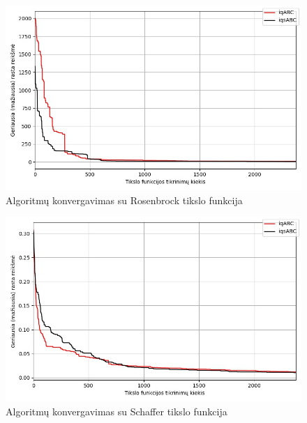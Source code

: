 \documentclass{VUMIFPSmagistrinis}
\begin{document}
\begin{landscape}
\begin{multicols}{2}
\begin{figure}[H]
    \centering
    \includegraphics[scale=0.5]{img/2kg/rosenbrock.jpg}
     \caption{Algoritmų konvergavimas su Rosenbrock tikslo funkcija}
    \label{img:vkon6}
\end{figure}

\begin{figure}[H]
    \centering
    \includegraphics[scale=0.5]{img/2kg/Schaffer.jpg}
     \caption{Algoritmų konvergavimas su Schaffer tikslo funkcija}
    \label{img:vkon7}
\end{figure}


\end{multicols}\newpage
\begin{multicols}{2}



\end{multicols}
\end{landscape}
\end{document}
